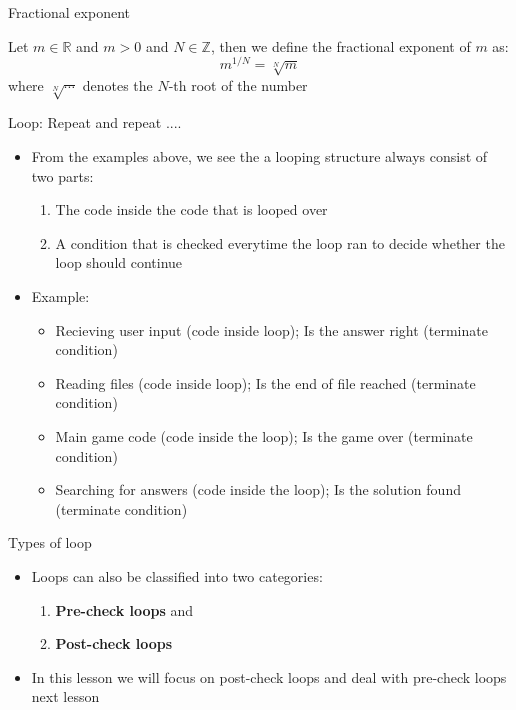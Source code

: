 \documentclass[10pt,xcolor={table,dvipsnames},t]{beamer}
\begin{document}
\begin{frame}{Fractional exponent}
  \begin{definition}
    Let $m \in \mathbb{R}$ and $m>0$ and $N\in \mathbb{Z}$, then we define the fractional exponent of $m$ as:
    \begin{equation}
      m^{1/N} = \sqrt[N]{m}
    \end{equation}
    where $\sqrt[N]{\cdots}$ denotes the $N$-th root of the number
  \end{definition}
\end{frame}

\begin{frame}{Loop: Repeat and repeat ....}
  \begin{itemize}
    \item From the examples above, we see the a looping structure always consist of two parts:
    \begin{enumerate}
      \item The code inside the code that is looped over 
      \item A condition that is checked everytime the loop ran to decide whether the loop should continue
    \end{enumerate}
    \item  Example: 
    \begin{itemize}
      \item Recieving user input (code inside loop); Is the answer right (terminate condition)
      \item Reading files (code inside loop); Is the end of file reached (terminate condition)
      \item Main game code (code inside the loop); Is the game over (terminate condition)
      \item Searching for answers (code inside the loop); Is the solution found (terminate condition)
    \end{itemize}
  \end{itemize}
\end{frame}

\begin{frame}{Types of loop}
  \begin{itemize}
    \item Loops can also be classified into two categories:
    \begin{enumerate}
      \item \textbf{Pre-check loops} and
      \item \textbf{Post-check loops}
    \end{enumerate}
    \item In this lesson we will focus on post-check loops and deal with pre-check loops next lesson
  \end{itemize}
\end{frame}
\end{document}
